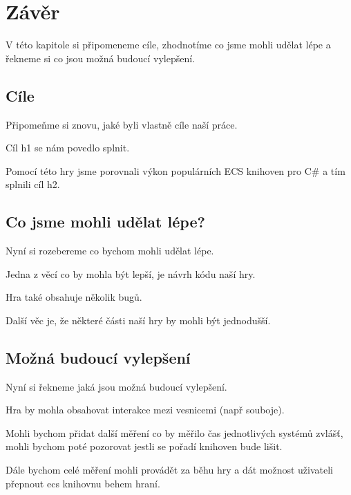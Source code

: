 \chapter{Závěr}
V této kapitole si připomeneme cíle, zhodnotíme co jsme mohli udělat lépe a řekneme si co jsou možná budoucí vylepšení.

\section{Cíle}
Připomeňme si znovu, jaké byli vlastně cíle naší práce.

Cíl h1 se nám povedlo splnit.

Pomocí této hry jsme porovnali výkon populárních ECS knihoven pro C\# a tím splnili cíl h2.

\section{Co jsme mohli udělat lépe?}
Nyní si rozebereme co bychom mohli udělat lépe.

Jedna z věcí co by mohla být lepší, je návrh kódu naší hry.

Hra také obsahuje několik bugů.

Další věc je, že některé části naší hry by mohli být jednodušší.

\section{Možná budoucí vylepšení}
Nyní si řekneme jaká jsou možná budoucí vylepšení.

Hra by mohla obsahovat interakce mezi vesnicemi (např souboje).

Mohli bychom přidat další měření co by měřilo čas jednotlivých systémů zvlášť, mohli bychom poté pozorovat jestli se pořadí knihoven bude lišit.

Dále bychom celé měření mohli provádět za běhu hry a dát možnost uživateli přepnout ecs knihovnu behem hraní.




